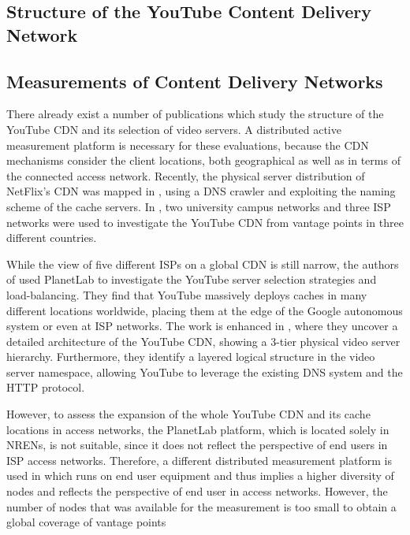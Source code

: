 \subsection{Structure of the YouTube Content Delivery Network}

\subsection{Measurements of Content Delivery Networks}
There already exist a number of publications which study the structure of the YouTube CDN and its selection of video servers.
A distributed active measurement platform is necessary for these evaluations, because the CDN mechanisms consider the client locations, both geographical as well as in terms of the connected access network.
Recently, the physical server distribution of NetFlix's CDN was mapped in \cite{bottger2016open}, using a DNS crawler and exploiting the naming scheme of the cache servers.
In \cite{torres2011dissecting}, two university campus networks and three ISP networks were used to investigate the YouTube CDN from vantage points in three different countries.

While the view of five different ISPs on a global CDN is still narrow, the authors of \cite{adhikari2011you} used PlanetLab to investigate the YouTube server selection strategies and load-balancing.
They find that YouTube massively deploys caches in many different locations worldwide, placing them at the edge of the Google autonomous system or even at ISP networks.
The work is enhanced in \cite{adhikari2012vivisecting}, where they uncover a detailed architecture of the YouTube CDN, showing a 3-tier physical video server hierarchy.
Furthermore, they identify a layered logical structure in the video server namespace, allowing YouTube to leverage the existing DNS system and the HTTP protocol.

However, to assess the expansion of the whole YouTube CDN and its cache locations in access networks, the PlanetLab platform, which is located solely in NRENs, is not suitable, since it does not reflect the perspective of end users in ISP access networks.
Therefore, a different distributed measurement platform is used in \cite{rafetseder2011exploring} which runs on end user equipment and thus implies a higher diversity of nodes and reflects the perspective of end user in access networks.
However, the number of nodes that was available for the measurement is too small to obtain a global coverage of vantage points

